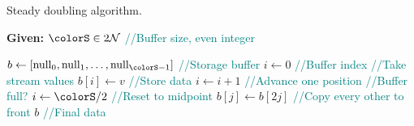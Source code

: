 \begin{algorithm}[H]
\caption{Steady doubling algorithm.}
\label{alg:steady-doubling}
\begin{minipage}{0.5\textwidth}
    \hspace*{\algorithmicindent} \textbf{Given:} $\colorS \in 2\mathcal{N}$ \textcolor{teal}{\small//Buffer size, even integer}
    \hspace*{\algorithmicindent}    \begin{algorithmic}[1]
        \State $b \gets [\mathrm{null}_0, \mathrm{null}_1, \ldots, \mathrm{null}_{\colorS - 1}]$ \textcolor{teal}{\small//Storage buffer}
        \State $i \gets 0$ \textcolor{teal}{\small//Buffer index}
         \textcolor{teal}{\small//Take stream values}
        \State $b[i] \gets v$ \textcolor{teal}{\small//Store data}
        \State $i \gets i + 1$  \textcolor{teal}{\small//Advance one position}
         \textcolor{teal}{\small//Buffer full?}
        \State $i \gets \colorS / 2$ \textcolor{teal}{\small//Reset to midpoint}
        \For{$j \in [0\twodots \colorS/2)$}
        \State $b[j] \gets b[2j]$ \textcolor{teal}{\small//Copy every other to front}
        \EndFor
        \EndIf
        \EndFor
        \Return $b$ \textcolor{teal}{\small//Final data}
    \end{algorithmic}
\end{minipage}
\end{algorithm}
